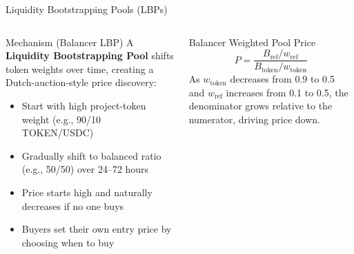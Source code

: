 \documentclass[8pt,aspectratio=169]{beamer}
\begin{document}
\begin{frame}{Liquidity Bootstrapping Pools (LBPs)}
\begin{columns}[T]
\begin{block}{Mechanism (Balancer LBP)}
\footnotesize
A \textbf{Liquidity Bootstrapping Pool} shifts token weights over time, creating a Dutch-auction-style price discovery:
\begin{itemize}
  \item Start with high project-token weight (e.g., 90/10 TOKEN/USDC)
  \item Gradually shift to balanced ratio (e.g., 50/50) over 24--72 hours
  \item Price starts high and naturally decreases if no one buys
  \item Buyers set their own entry price by choosing when to buy
\end{itemize}
\end{block}
\vspace{1mm}
\begin{block}{Balancer Weighted Pool Price}
\footnotesize
\[
P = \frac{B_{\text{ref}} / w_{\text{ref}}}{B_{\text{token}} / w_{\text{token}}}
\]
As $w_{\text{token}}$ decreases from 0.9 to 0.5 and $w_{\text{ref}}$ increases from 0.1 to 0.5, the denominator grows relative to the numerator, driving price down.
\end{block}


\end{columns}
\end{frame}
\end{document}
